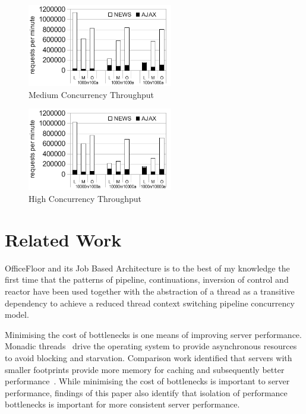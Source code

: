 \documentclass[conference]{ieee/IEEEtran}
\begin{document}
\begin{figure}[!t]
\centering 
\includegraphics[width=2.5in]{MediumConcurrencyThroughput}
\caption{Medium Concurrency Throughput}
\label{fig:medium_concurrency_throughput}
\end{figure}

\begin{figure}[!t]
\centering 
\includegraphics[width=2.5in]{HighConcurrencyThroughput}
\caption{High Concurrency Throughput}
\label{fig:high_concurrency_throughput}
\end{figure}
  


\section{Related Work}
OfficeFloor and its Job Based Architecture is to the best of my knowledge the
first time that the patterns of pipeline, continuations, inversion of control
and reactor have been used together with the abstraction of a thread as a
transitive dependency to achieve a reduced thread context switching pipeline
concurrency model.

Minimising the cost of bottlenecks is one means of improving server performance.
 Monadic threads~\cite{monadic-thread} drive the operating system to provide
asynchronous resources to avoid blocking and starvation.  Comparison work
identified that servers with smaller footprints provide more memory for caching
and subsequently better performance~\cite{low-server-footprint}.  While
minimising the cost of bottlenecks is important to server performance, findings
of this paper also identify that isolation of performance bottlenecks is
important for more consistent server performance.
\end{document}
